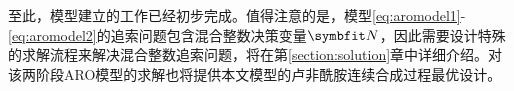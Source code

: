 至此，模型建立的工作已经初步完成。值得注意的是，模型\eqref{eq:aromodel1}-\eqref{eq:aromodel2}的追索问题包含混合整数决策变量$\symbfit N$，因此需要设计特殊的求解流程来解决混合整数追索问题，将在第\ref{section:solution}章中详细介绍。对该两阶段ARO模型的求解也将提供本文模型的卢非酰胺连续合成过程最优设计。









